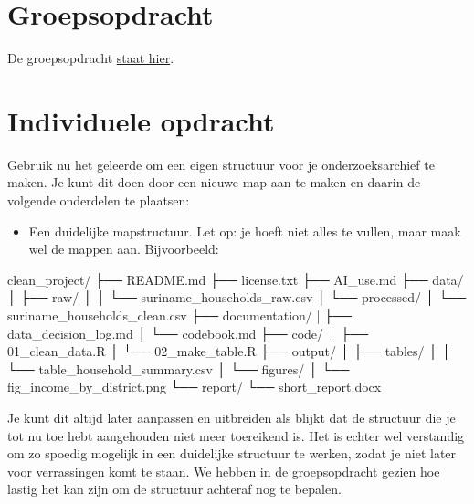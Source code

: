 \documentclass[
  letterpaper,
  DIV=11,
  numbers=noendperiod]{scrreprt}
\newenvironment{Shaded}{\begin{snugshade}}{\end{snugshade}}
\newcommand{\NormalTok}[1]{\textcolor[rgb]{0.00,0.23,0.31}{#1}}
\providecommand{\tightlist}{%
  \setlength{\itemsep}{0pt}\setlength{\parskip}{0pt}}
\begin{document}
\section{Groepsopdracht}\label{groepsopdracht-3}

De groepsopdracht \href{opdracht/Groepsopdracht4.html}{staat hier}.

\section{Individuele opdracht}\label{individuele-opdracht-3}

Gebruik nu het geleerde om een eigen structuur voor je onderzoeksarchief
te maken. Je kunt dit doen door een nieuwe map aan te maken en daarin de
volgende onderdelen te plaatsen:

\begin{itemize}
\tightlist
\item
  Een duidelijke mapstructuur. Let op: je hoeft niet alles te vullen,
  maar maak wel de mappen aan. Bijvoorbeeld:
\end{itemize}

\begin{Shaded}
\begin{Highlighting}[]
\NormalTok{clean\_project/}
\NormalTok{├── README.md}
\NormalTok{├── license.txt}
\NormalTok{├── AI\_use.md}
\NormalTok{├── data/}
\NormalTok{│   ├── raw/}
\NormalTok{│   │   └── suriname\_households\_raw.csv}
\NormalTok{│   └── processed/}
\NormalTok{│       └── suriname\_households\_clean.csv}
\NormalTok{├── documentation/}
\NormalTok{|   ├── data\_decision\_log.md}
\NormalTok{│   └── codebook.md}
\NormalTok{├── code/}
\NormalTok{│   ├── 01\_clean\_data.R}
\NormalTok{│   └── 02\_make\_table.R}
\NormalTok{├── output/}
\NormalTok{│   ├── tables/}
\NormalTok{│   │   └── table\_household\_summary.csv}
\NormalTok{│   └── figures/}
\NormalTok{│       └── fig\_income\_by\_district.png}
\NormalTok{└── report/}
\NormalTok{    └── short\_report.docx}
    
\end{Highlighting}
\end{Shaded}

Je kunt dit altijd later aanpassen en uitbreiden als blijkt dat de
structuur die je tot nu toe hebt aangehouden niet meer toereikend is.
Het is echter wel verstandig om zo spoedig mogelijk in een duidelijke
structuur te werken, zodat je niet later voor verrassingen komt te
staan. We hebben in de groepsopdracht gezien hoe lastig het kan zijn om
de structuur achteraf nog te bepalen.
\end{document}
